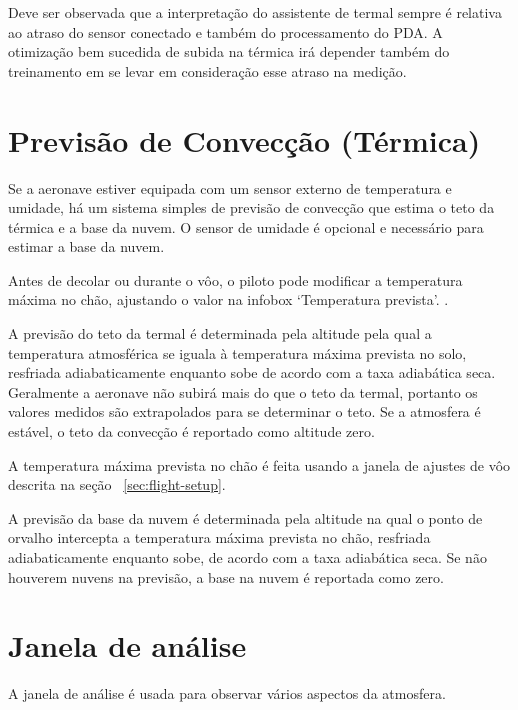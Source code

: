 Deve ser observada que a interpretação do assistente de termal sempre é relativa ao atraso do sensor conectado e também do processamento do PDA.  A otimização bem sucedida de subida na térmica irá depender também do treinamento em se levar em consideração esse atraso na medição.


\section{Previsão de Convecção (Térmica)}\label{sec:convection-forecast}

Se a aeronave estiver equipada com um sensor externo de temperatura e umidade, há um sistema simples de previsão de convecção que estima o teto da térmica e a base da nuvem.  O sensor de umidade é opcional e necessário para estimar a base da nuvem.

Antes de decolar ou durante o vôo, o piloto pode modificar a temperatura máxima no chão, ajustando o valor na infobox ‘Temperatura prevista’.  
 {\InfoBox}.

A previsão do teto da termal é determinada pela altitude pela qual a temperatura atmosférica se iguala à temperatura máxima prevista no solo, resfriada adiabaticamente enquanto sobe de acordo com a taxa adiabática seca.  Geralmente a aeronave não subirá mais do que o teto da termal, portanto os valores medidos são extrapolados para se determinar o teto.  Se a atmosfera é estável, o teto da convecção é reportado como altitude zero.

A temperatura máxima prevista no chão é feita usando a janela de ajustes de vôo descrita na seção 
~\ref{sec:flight-setup}.


%

A previsão da base da nuvem é determinada pela altitude na qual o ponto de orvalho intercepta a temperatura máxima prevista no chão, resfriada adiabaticamente enquanto sobe, de acordo com a taxa adiabática seca.  Se não houverem nuvens na previsão, a base na nuvem é reportada como zero.


\section{Janela de análise}

A janela de análise é usada para observar vários aspectos da atmosfera.

